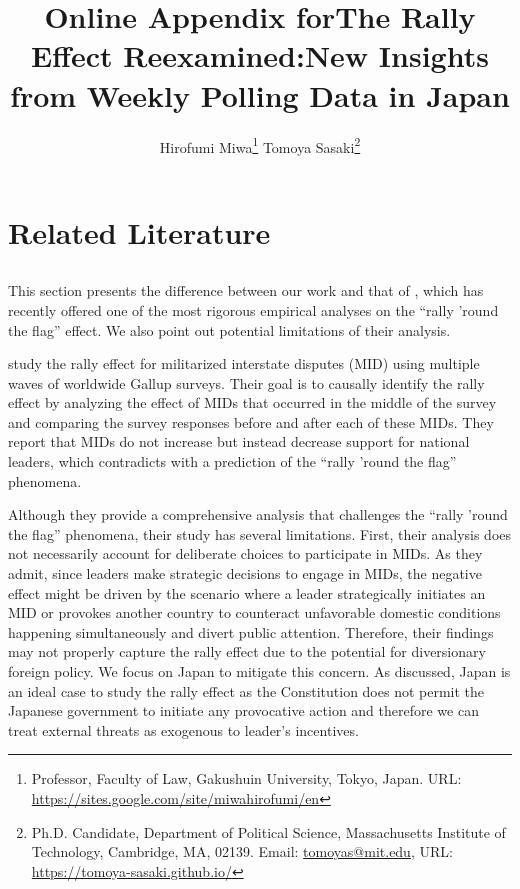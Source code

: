 \documentclass[12pt,letterpaper]{scrartcl}
\title{\textbf{\textsf{\LARGE Online Appendix for\linebreak The Rally Effect Reexamined:\linebreak New Insights from Weekly Polling Data in Japan}}}
\author{
  \if0\blind
  \hspace{1.5in}
  Hirofumi Miwa\thanks{Professor, Faculty of Law, Gakushuin University,
  Tokyo, Japan. URL: \href{https://sites.google.com/site/miwahirofumi/en}{https://sites.google.com/site/miwahirofumi/en}}
  \hspace{.7in}
  Tomoya Sasaki\thanks{Ph.D. Candidate, Department of
  Political Science, Massachusetts Institute of Technology,
  Cambridge, MA, 02139. Email:
  \href{mailto:tomoyas@mit.edu}{tomoyas@mit.edu},
  URL: \href{https://tomoya-sasaki.github.io/}{https://tomoya-sasaki.github.io/}}
  \fi
}
\date{}
\begin{document}
\begin{titlepage}
\maketitle
\setcounter{tocdepth}{2}
\tableofcontents
\thispagestyle{empty}
\end{titlepage}


\normalsize
\doublespacing
\section{Related Literature}\label{app:sec:literature}

\subsection{\citet{seo2023}}\label{app:subsec:seo2023}

This section presents the difference between our work and that of \citet{seo2023}, which has recently offered one of the most rigorous empirical analyses on the ``rally 'round the flag'' effect. We also point out potential limitations of their analysis.

\citet{seo2023} study the rally effect for militarized interstate disputes (MID) using multiple waves of worldwide Gallup surveys. Their goal is to causally identify the rally effect by analyzing the effect of MIDs that occurred in the middle of the survey and comparing the survey responses before and after each of these MIDs. They report that MIDs do not increase but instead decrease support for national leaders, which contradicts with a prediction of the ``rally 'round the flag'' phenomena.

Although they provide a comprehensive analysis that challenges the ``rally 'round the flag'' phenomena, their study has several limitations. First, their analysis does not necessarily account for deliberate choices to participate in MIDs. As they admit, since leaders make strategic decisions to engage in MIDs, the negative effect might be driven by the scenario where a leader strategically initiates an MID or provokes another country to counteract unfavorable domestic conditions happening simultaneously and divert public attention. Therefore, their findings may not properly capture the rally effect due to the potential for diversionary foreign policy. We focus on Japan to mitigate this concern. As discussed, Japan is an ideal case to study the rally effect as the Constitution does not permit the Japanese government to initiate any provocative action and therefore we can treat external threats as exogenous to leader's incentives.
\end{document}
